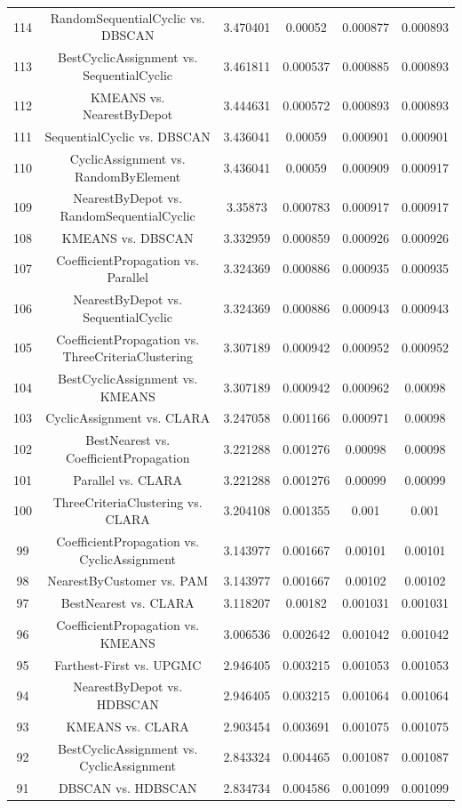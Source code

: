 \documentclass[a4paper,10pt]{article}
\begin{document}
\begin{landscape}
\begin{table}[!htp]
\begin{tabular}{cccccc}
114&RandomSequentialCyclic vs. DBSCAN&3.470401&0.00052&0.000877&0.000893\\
113&BestCyclicAssignment vs. SequentialCyclic&3.461811&0.000537&0.000885&0.000893\\
112&KMEANS vs. NearestByDepot&3.444631&0.000572&0.000893&0.000893\\
111&SequentialCyclic vs. DBSCAN&3.436041&0.00059&0.000901&0.000901\\
110&CyclicAssignment vs. RandomByElement&3.436041&0.00059&0.000909&0.000917\\
109&NearestByDepot vs. RandomSequentialCyclic&3.35873&0.000783&0.000917&0.000917\\
108&KMEANS vs. DBSCAN&3.332959&0.000859&0.000926&0.000926\\
107&CoefficientPropagation vs. Parallel&3.324369&0.000886&0.000935&0.000935\\
106&NearestByDepot vs. SequentialCyclic&3.324369&0.000886&0.000943&0.000943\\
105&CoefficientPropagation vs. ThreeCriteriaClustering&3.307189&0.000942&0.000952&0.000952\\
104&BestCyclicAssignment vs. KMEANS&3.307189&0.000942&0.000962&0.00098\\
103&CyclicAssignment vs. CLARA&3.247058&0.001166&0.000971&0.00098\\
102&BestNearest vs. CoefficientPropagation&3.221288&0.001276&0.00098&0.00098\\
101&Parallel vs. CLARA&3.221288&0.001276&0.00099&0.00099\\
100&ThreeCriteriaClustering vs. CLARA&3.204108&0.001355&0.001&0.001\\
99&CoefficientPropagation vs. CyclicAssignment&3.143977&0.001667&0.00101&0.00101\\
98&NearestByCustomer vs. PAM&3.143977&0.001667&0.00102&0.00102\\
97&BestNearest vs. CLARA&3.118207&0.00182&0.001031&0.001031\\
96&CoefficientPropagation vs. KMEANS&3.006536&0.002642&0.001042&0.001042\\
95&Farthest-First vs. UPGMC&2.946405&0.003215&0.001053&0.001053\\
94&NearestByDepot vs. HDBSCAN&2.946405&0.003215&0.001064&0.001064\\
93&KMEANS vs. CLARA&2.903454&0.003691&0.001075&0.001075\\
92&BestCyclicAssignment vs. CyclicAssignment&2.843324&0.004465&0.001087&0.001087\\
91&DBSCAN vs. HDBSCAN&2.834734&0.004586&0.001099&0.001099\\

\end{tabular}
\end{table}
\end{landscape}
\end{document}
